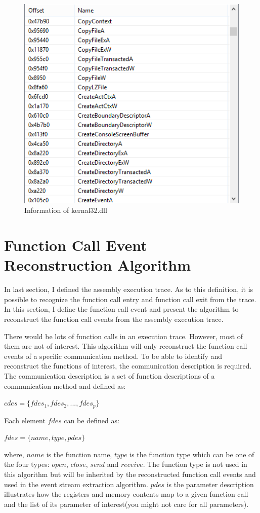 \begin{figure}[H]
\centerline{\includegraphics[scale=0.6]{Figures/executable}}
\caption{Information of kernal32.dll}
\label{executable}
\end{figure}

\section{Function Call Event Reconstruction Algorithm}
In last section, I defined the assembly execution trace. As to this definition, it is possible to recognize the function call entry and function call exit from the trace.  In this section, I define the function call event and present the algorithm to reconstruct the function call events from the assembly execution trace. 

There would be lots of function calls in an execution trace. However, most of them are not of interest. This algorithm will only reconstruct the function call events of a specific communication method. To be able to identify and reconstruct the functions of interest, the communication description is required. The communication description is a set of function descriptions of a communication method and defined as:

$cdes = \lbrace fdes_1, fdes_2,...,fdes_p \rbrace$

Each element $fdes$ can be defined as:

$fdes = \lbrace name, type, pdes \rbrace$

where, $name$ is the function name, $type$ is the function type which can be one of the four types: $open$, $close$, $send$ and $receive$. The function type is not used in this algorithm but will be inherited by the reconstructed function call events and used in the event stream extraction algorithm. $pdes$ is the parameter description illustrates how the registers and memory contents map to a given function call and the list of its parameter of interest(you might not care for all parameters). 

